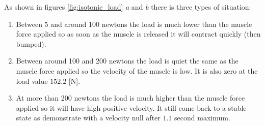 \documentclass{cmc}
\begin{document}
As shown in figures \ref{fig:isotonic_load} \textit{a} and \textit{b} there is three types of situation:
\begin{enumerate}
    \item Between 5 and around 100 newtons the load is much lower than the muscle force applied so as soon as the muscle is released it will contract quickly (then bumped).
    \item Between around 100 and 200 newtons the load is quiet the same as the muscle force applied so the velocity of the muscle is low. It is also zero at the load value $152.2$ [N].
    \item At more than 200 newtons the load is much higher than the muscle force applied so it will have high positive velocity. It still come back to a stable state as demonstrate with a velocity null after $1.1$ second maximum.
    
\end{enumerate}
\end{document}

